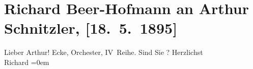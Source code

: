 

         
         \renewcommand{\erwaehntePersonen}{Personen: Richard Beer-Hofmann}
         \renewcommand{\erwaehnteOrte}{Orte: Burgtheater, Wien}
         \renewcommand{\erwaehnteWerke}{Werke: Macbeth}
               \section[Richard Beer-Hofmann an Arthur Schnitzler, {[}18. 5. 1895{]}]{ Richard Beer-Hofmann an Arthur Schnitzler, {[}18. 5. 1895{]}}\nopagebreak{}\rehead{ }\begin{ledgroupsized}[t]{13cm}\normalsize\beginnumbering \toendnotes[C]{\smallbreak\pagebreak[2]} 
\toendnotes[C]{\smallbreak}\pstart{}{\pb}Lieber Arthur!\pend\pstart
           Ecke, Orchester, IV Reihe. Sind Sie \label{K_L00443-1v}\label{K_L00443-1h}?\pend
           \pstart
           Herzlichst{\\[\baselineskip]}\spacefill\mbox{Richard}\pend
           \leftskip=0em{}
         
         \endnumbering{}\end{ledgroupsized}  \newcommand{\dateiname}{L00443}\newcommand{\titel}{Richard Beer-Hofmann an Arthur Schnitzler, [18. 5. 1895]}\newcommand{\editorInnen}{Martin Anton Müller und Gerd-Hermann Susen}
      